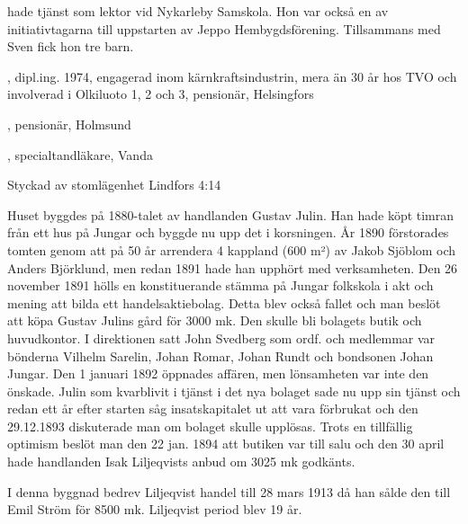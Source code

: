  hade tjänst som lektor vid Nykarleby Samskola. Hon var också en av initiativtagarna till uppstarten av Jeppo Hembygdsförening. Tillsammans med Sven fick hon tre barn.
\begin{jhchildren}
  \item {}, dipl.ing. 1974, engagerad inom kärnkraftsindustrin, mera än 30 år hos TVO och involverad i Olkiluoto 1, 2 och 3, pensionär, Helsingfors
  \item {}, pensionär, Holmsund
  \item {}, specialtandläkare, Vanda
\end{jhchildren}




Styckad av stomlägenhet Lindfors 4:14


Huset byggdes på 1880-talet av handlanden Gustav Julin. Han hade köpt timran från ett hus på Jungar och byggde nu upp det i korsningen. År 1890 förstorades tomten genom att på 50 år arrendera 4 kappland (600 m²) av Jakob Sjöblom och Anders Björklund, men redan 1891 hade han upphört med verksamheten. Den 26 november 1891 hölls en konstituerande stämma på Jungar folkskola i akt och mening att bilda ett handelsaktiebolag. Detta blev också fallet och man beslöt att köpa Gustav Julins gård för 3000 mk. Den skulle bli bolagets butik och huvudkontor. I direktionen satt John Svedberg som ordf. och medlemmar var bönderna Vilhelm Sarelin, Johan Romar, Johan Rundt och bondsonen Johan Jungar. Den 1 januari 1892 öppnades affären, men lönsamheten var inte den önskade. Julin som kvarblivit i tjänst i det nya bolaget sade nu upp sin tjänst och redan ett år efter starten såg insatskapitalet ut att vara förbrukat och den 29.12.1893 diskuterade man om bolaget skulle upplösas. Trots en tillfällig optimism beslöt man den 22 jan. 1894 att butiken var till salu och den 30 april hade handlanden Isak Liljeqvists anbud om 3025 mk godkänts.

I denna byggnad bedrev Liljeqvist handel till 28 mars 1913 då han sålde den till Emil Ström för 8500 mk. Liljeqvist period blev 19 år.

